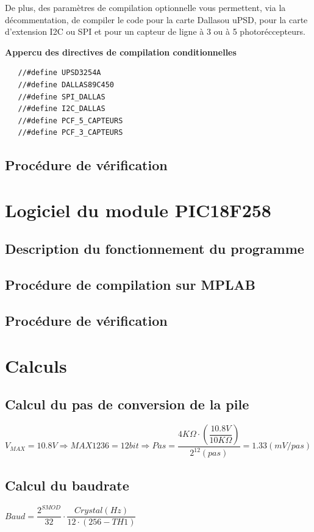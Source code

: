 \documentclass[10pt,a4paper,final]{article}
\begin{document}
\begin{spacing}{1.5}
De plus, des paramètres de compilation optionnelle vous permettent, via la décommentation, de compiler le code pour la carte Dallasou uPSD, pour la carte d'extension I2C ou SPI et pour un capteur de ligne à 3 ou à 5 photoréccepteurs.\\
\end{spacing}
\textbf{Appercu des directives de compilation conditionnelles}
\begin{lstlisting}
   //#define UPSD3254A
   //#define DALLAS89C450
   //#define SPI_DALLAS
   //#define I2C_DALLAS
   //#define PCF_5_CAPTEURS
   //#define PCF_3_CAPTEURS
\end{lstlisting}
\begin{spacing}{1.5}
\subsection{Procédure de vérification}

\pagebreak
\section{Logiciel du module PIC18F258}
\subsection{Description du fonctionnement du programme}

\subsection{Procédure de compilation sur MPLAB}

\subsection{Procédure de vérification}

\pagebreak
\section{Calculs}
\subsection{Calcul du pas de conversion de la pile}
$V_{MAX}=10.8V \Rightarrow MAX1236  = 12 bit \Rightarrow Pas = \dfrac{4K\Omega \cdot \left(\dfrac{10.8V}{10K\Omega}\right)}{2^{12}(pas)} = 1.33(mV/pas)$
\subsection{Calcul du baudrate}
$Baud = \dfrac{2^{SMOD}}{32}\cdot\dfrac{Crystal (Hz)}{12\cdot(256 - TH1)}$\\


\end{spacing}
\end{document}
